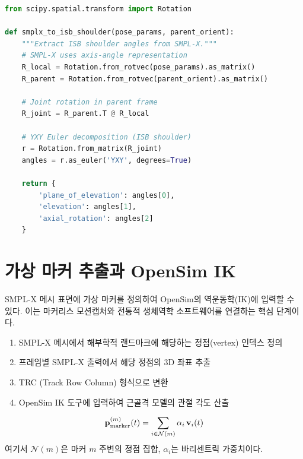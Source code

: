 \documentclass[11pt, a4paper]{report}
\begin{document}
\begin{codebox}[title={SMPL-X 관절 회전에서 ISB 각도 추출}]
\begin{lstlisting}[language=Python]
from scipy.spatial.transform import Rotation

def smplx_to_isb_shoulder(pose_params, parent_orient):
    """Extract ISB shoulder angles from SMPL-X."""
    # SMPL-X uses axis-angle representation
    R_local = Rotation.from_rotvec(pose_params).as_matrix()
    R_parent = Rotation.from_rotvec(parent_orient).as_matrix()

    # Joint rotation in parent frame
    R_joint = R_parent.T @ R_local

    # YXY Euler decomposition (ISB shoulder)
    r = Rotation.from_matrix(R_joint)
    angles = r.as_euler('YXY', degrees=True)

    return {
        'plane_of_elevation': angles[0],
        'elevation': angles[1],
        'axial_rotation': angles[2]
    }
\end{lstlisting}
\end{codebox}

\section{가상 마커 추출과 OpenSim IK}

SMPL-X 메시 표면에 가상 마커를 정의하여 OpenSim의 역운동학(IK)에 입력할 수 있다.
이는 마커리스 모션캡처와 전통적 생체역학 소프트웨어를 연결하는 핵심 단계이다.

\begin{pipelinebox}[title={가상 마커에서 OpenSim IK까지}]
\begin{enumerate}[nosep]
  \item SMPL-X 메시에서 해부학적 랜드마크에 해당하는 정점(vertex) 인덱스 정의
  \item 프레임별 SMPL-X 출력에서 해당 정점의 3D 좌표 추출
  \item TRC (Track Row Column) 형식으로 변환
  \item OpenSim IK 도구에 입력하여 근골격 모델의 관절 각도 산출
\end{enumerate}
\end{pipelinebox}

\begin{equation}
  \mathbf{p}_{\text{marker}}^{(m)}(t) = \sum_{i \in \mathcal{N}(m)} \alpha_i \, \mathbf{v}_i(t)
\end{equation}
여기서 $\mathcal{N}(m)$은 마커 $m$ 주변의 정점 집합, $\alpha_i$는 바리센트릭 가중치이다.
\end{document}
